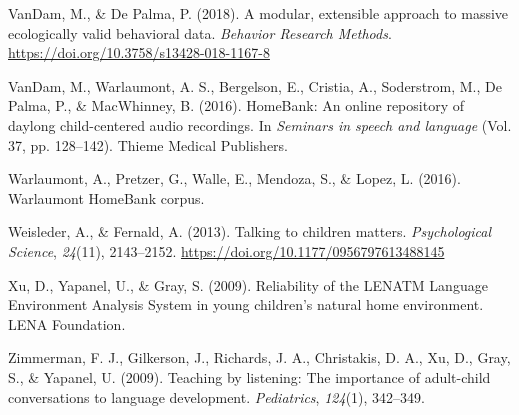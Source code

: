 \documentclass[english,table,man,floatsintext]{apa6}
\begin{document}
\leavevmode\hypertarget{ref-VanDam2018}{}%
VanDam, M., \& De Palma, P. (2018). A modular, extensible approach to massive ecologically valid behavioral data. \emph{Behavior Research Methods}. \url{https://doi.org/10.3758/s13428-018-1167-8}

\leavevmode\hypertarget{ref-vandam2016homebank}{}%
VanDam, M., Warlaumont, A. S., Bergelson, E., Cristia, A., Soderstrom, M., De Palma, P., \& MacWhinney, B. (2016). HomeBank: An online repository of daylong child-centered audio recordings. In \emph{Seminars in speech and language} (Vol. 37, pp. 128--142). Thieme Medical Publishers.

\leavevmode\hypertarget{ref-warlaumont2016warlaumont}{}%
Warlaumont, A., Pretzer, G., Walle, E., Mendoza, S., \& Lopez, L. (2016). Warlaumont HomeBank corpus.

\leavevmode\hypertarget{ref-Weisleder2013a}{}%
Weisleder, A., \& Fernald, A. (2013). Talking to children matters. \emph{Psychological Science}, \emph{24}(11), 2143--2152. \url{https://doi.org/10.1177/0956797613488145}

\leavevmode\hypertarget{ref-Xu2009a}{}%
Xu, D., Yapanel, U., \& Gray, S. (2009). Reliability of the LENATM Language Environment Analysis System in young children's natural home environment. LENA Foundation.

\leavevmode\hypertarget{ref-zimmerman2009}{}%
Zimmerman, F. J., Gilkerson, J., Richards, J. A., Christakis, D. A., Xu, D., Gray, S., \& Yapanel, U. (2009). Teaching by listening: The importance of adult-child conversations to language development. \emph{Pediatrics}, \emph{124}(1), 342--349.
\end{document}
